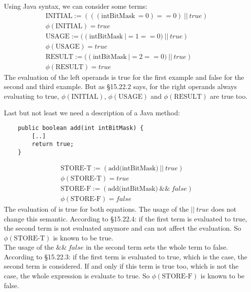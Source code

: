 Using Java syntax, we can consider some terms:
\begin{equation}\label{eqn_init}\begin{split}
\text{INITIAL} := (((\text{intBitMask} \: = 0) == 0) \: || \: true)\\
\phi(\text{INITIAL}) = true\\
\text{USAGE} := ((\text{intBitMask} \: |= 1 == 0) \: || \: true)\\
\phi(\text{USAGE}) = true\\
\text{RESULT} := ((\text{intBitMask} \: |= 2 == 0) \: || \: true)\\
\phi(\text{RESULT}) = true
\end{split}\end{equation}
The evaluation of the left operands is true for the first example and false for the second and third example. But as §15.22.2 says, for the right operands always evaluating to true, $\phi(\text{INITIAL})$, $\phi(\text{USAGE})$ and $\phi(\text{RESULT})$ are true too.

Last but not least we need a description of a Java method:
\begin{verbatim}
    public boolean add(int intBitMask) {
        [..]
        return true;
    }
\end{verbatim}
\begin{equation}\label{eqn_store}\begin{split}
\text{STORE-T} := (\text{add(intBitMask)} \: || \: true)\\
\phi(\text{STORE-T}) = true\\
\text{STORE-F} := (\text{add(intBitMask)} \: \&\& \: false)\\
\phi(\text{STORE-F}) = false
\end{split}\end{equation}
The evaluation of  is true for both equations. The usage of the $|| \: true$ does not change this semantic. According to §15.22.4: if the first term is evaluated to true, the second term is not evaluated anymore and can not affect the evaluation. So  $\phi(\text{STORE-T})$ is known to be true.\\
The usage of the $\&\& \: false$ in the second term sets the whole term to false. According to §15.22.3: if the first term is evaluated to true, which is the case, the second term is considered. If and only if this term is true too, which is not the case, the whole expression is evaluate to true. So  $\phi(\text{STORE-F})$ is known to be false.

